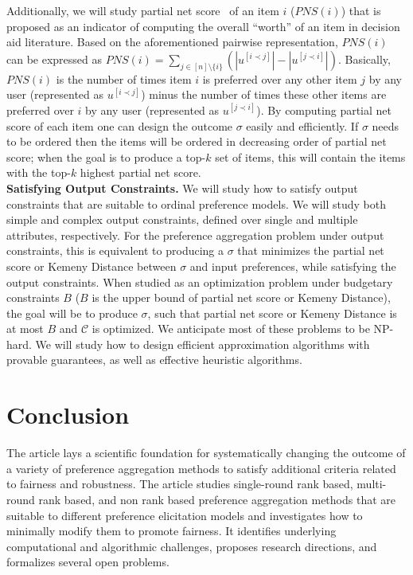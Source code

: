 \documentclass[11pt]{article}
\begin{document}
Additionally, we will study partial net score~\cite{figueira2005choice} of an item $i$ ($PNS(i)$) that is proposed as an indicator of computing the overall ``worth'' of an item in decision aid literature. Based on the aforementioned pairwise representation, $PNS(i)$ can be expressed as 
    $PNS(i) =  \sum_{j \in [n]\setminus\{i\}} 
    \left(|u^{[i \prec j]}| - |u^{[j \prec i]}|\right)$.
Basically, $PNS(i)$ is the number of times item $i$ is preferred over any other item $j$ by any user (represented as $u^{[i \prec j]}$) minus the number of times these other items are preferred over $i$ by any user (represented as $u^{[j \prec i]}$). By computing partial net score of each item one can design the outcome $\sigma$ easily and efficiently. If $\sigma$ needs to be ordered then the items will be ordered in decreasing order of partial net score; when the goal is to produce a top-$k$ set of items, this will contain the items with the top-$k$ highest partial net score.\\
{\bf Satisfying Output Constraints.}
We will study how to satisfy output constraints that are suitable to ordinal preference models. We will study both simple and complex output constraints, defined over single and multiple attributes, respectively. For the preference aggregation problem under output constraints, this is equivalent to producing a $\sigma$ that minimizes the partial net score or Kemeny Distance between  $\sigma$ and input preferences, while satisfying the output constraints. When studied as an optimization problem under budgetary constraints $B$ ($B$ is the upper bound of partial net score or Kemeny Distance), the goal will be to produce $\sigma$, such that partial net score or Kemeny Distance is at most $B$ and $\mathcal{C}$ is optimized. We anticipate most of these problems to be NP-hard. We will study how to design efficient approximation algorithms with provable guarantees, as well as effective heuristic algorithms.


\vspace{-0.1in}
\section{Conclusion}
\vspace{-0.1in}
The article lays a scientific foundation for systematically changing the outcome of a variety of preference aggregation methods to satisfy additional criteria related to fairness and robustness.  The article studies single-round rank based, multi-round rank based, and non rank based preference aggregation methods that are suitable to different preference elicitation models and investigates how to minimally modify them to promote fairness. It identifies underlying computational and algorithmic challenges, proposes research directions, and formalizes several open problems. 
\end{document}
